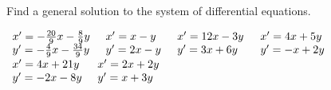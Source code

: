 \clearpage

\bb[resume]

\ii Find a general solution to the system of differential equations.

\bb
\ii $\displaystyle \begin{array}{l} x'=-\frac{20}{9}x-\frac{8}{9}y\\ y'=-\frac{4}{9}x-\frac{34}{9}y\end{array}$ \vfill %
\ii $\displaystyle \begin{array}{l} x'=x-y\\ y'=2x-y\end{array}$ \vfill %
\clearpage
\ii $\displaystyle \begin{array}{l}x'=12x-3y\\y'=3x+6y \end{array}$  \vfill %
\ii $\displaystyle \begin{array}{l} x' =4x+5y\\y'=-x+2y \end{array}$ \vfill %
\clearpage
\ii $\displaystyle \begin{array}{l} x'=4x+21y\\y'=-2x-8y\end{array}$ \vfill %
\ii $\displaystyle \begin{array}{l} x'=2x+2y\\y'=x+3y \end{array}$ \vfill %

\ee
\ee
